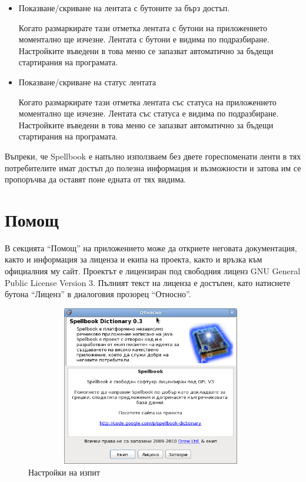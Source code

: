 \begin{itemize}
  \item Показване/скриване на лентата с бутоните за бърз достъп.

    Когато размаркирате тази отметка лентата с бутони на приложението
    моментално ще изчезне. Лентата с бутони е видима по
    подразбиране. Настройките въведени в това меню се запазват
    автоматично за бъдещи стартирания на програмата.

    \item Показване/скриване на статус лентата

      Когато размаркирате тази отметка лентата със статуса на приложението
    моментално ще изчезне. Лентата със статуса е видима по
    подразбиране. Настройките въведени в това меню се запазват
    автоматично за бъдещи стартирания на програмата.

\end{itemize}

Въпреки, че Spellbook е напълно използваем без двете гореспоменати
ленти в тях потребителите имат достъп до полезна информация и
възможности и затова им се пропоръчва да оставят поне едната от тях видима.

\section{Помощ}

В секцията "`Помощ"' на приложението може да откриете неговата
документация, както и информация за лиценза и екипа на проекта, както
и връзка към официалния му сайт. Проектът е лицензиран под свободния
лиценз GNU General Public License Version 3. Пълният текст на лиценза
е достъпен, като натиснете бутона "`Лиценз"' в диалоговия прозорец
"`Относно"'.

\begin{figure}[htbp]
  \caption{Настройки на изпит}
  \centering
  \includegraphics[width=110mm, height=70mm]{images/about_dialog.png}
\end{figure}
 
